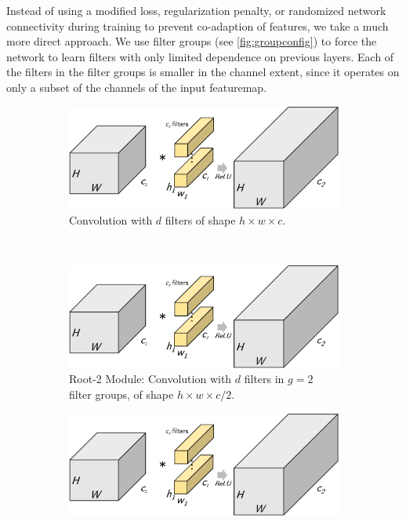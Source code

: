 \documentclass[thesis]{subfiles}
\begin{document}
	Instead of using a modified loss, regularization penalty, or randomized network connectivity during training to prevent co-adaption of features, we take a much more direct approach. We use filter groups (see \cref{fig:groupconfig}) to force the network to learn filters with only limited dependence on previous layers. Each of the filters in the filter groups is smaller in the channel extent, since it operates on only a subset of the channels of the input \gls{featuremap}. 
	
	\begin{figure}[tbp]
		\centering
		\begin{subfigure}[b]{0.95\textwidth}
			\centering
			\includegraphics[width=\textwidth, page=4]{Figs/PDF/groupfig}
			\caption{Convolution with $d$ filters of shape $h\times w\times c$.}
			\label{fig:normalresnet}
		\end{subfigure}\\
		\begin{subfigure}[b]{0.95\textwidth}
			\includegraphics[width=\textwidth, page=5]{Figs/PDF/groupfig}
			\caption{Root-2 Module: Convolution with $d$ filters in $g = 2$ filter groups, of shape $h\times w\times c/2$.}
			\label{fig:rootresnet2}
		\end{subfigure}
		\begin{subfigure}[b]{0.95\textwidth}
			\includegraphics[width=\textwidth, page=6]{Figs/PDF/groupfig}

\end{subfigure}
\end{figure}
\end{document}
